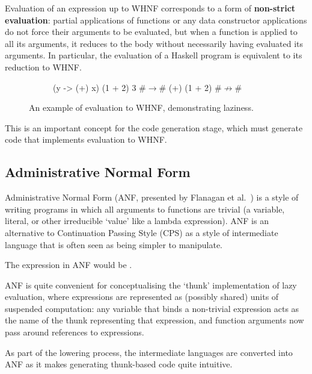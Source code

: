 \documentclass[dissertation.tex]{subfiles}
\begin{document}
{{        Evaluation of an expression up to WHNF corresponds to a form of \textbf{non-strict evaluation}: partial applications of functions or any data constructor applications do not force their arguments to be evaluated, but when a function is applied to all its arguments, it reduces to the body without necessarily having evaluated its arguments. In particular, the evaluation of a Haskell program is equivalent to its reduction to WHNF.

        \begin{figure}[h]
        \centering
        \begin{subfigure}[t]{0.5\textwidth}
        \begin{haskellfigure}
           (\x y -> (+) x) (1 + 2) 3
        #\(\rightarrow\)# (+) (1 + 2)
        #\(\not\rightarrow\)#
        \end{haskellfigure}
        \end{subfigure}
        \caption{An example of evaluation to WHNF, demonstrating laziness.}
        \end{figure}
        
        This is an important concept for the code generation stage, which must generate code that implements evaluation to WHNF.
    }
    \subsection{Administrative Normal Form}\label{sec:anf}
    {
        Administrative Normal Form (ANF, presented by Flanagan et al.\ \cite{ANF}) is a style of writing programs in which all arguments to functions are trivial (a variable, literal, or other irreducible `value' like a lambda expression). ANF is an alternative to Continuation Passing Style (CPS) as a style of intermediate language that is often seen as being simpler to manipulate.

        The expression  in ANF would be .

        ANF is quite convenient for conceptualising the `thunk' implementation of lazy evaluation, where expressions are represented as (possibly shared) units of suspended computation: any variable that binds a non-trivial expression acts as the name of the thunk representing that expression, and function arguments now pass around references to expressions. 

        As part of the lowering process, the intermediate languages are converted into ANF as it makes generating thunk-based code quite intuitive. 
    }
}
\end{document}
